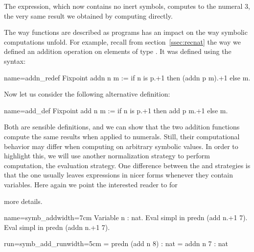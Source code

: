 The expression, which now contains no inert symbols, computes to the numeral 3,
the very same result we obtained by computing 
directly.


The way functions are described as programs has an impact on the way
symbolic computations unfold. For example, recall from
section~\ref{ssec:recnat} the way we defined an addition operation on
elements of type . It was defined using the  syntax: %

\begin{coq}{name=addn_redef}{}
Fixpoint addn n m := if n is p.+1 then (addn p m).+1 else m.
\end{coq}

Now let us consider the following alternative definition:

\begin{coq}{name=add_def}{}
Fixpoint add n m := if n is p.+1 then add p m.+1 else m.
\end{coq}

Both are sensible definitions, and we can show that the two addition
functions compute the same results when applied to numerals.  Still,
their computational behavior may differ when computing on arbitrary
symbolic values. In order to highlight this, we will use another
normalization strategy to perform computation, the 
evaluation strategy.  One difference between the 
and  strategies is that the  one usually leaves
expressions in nicer forms whenever they contain variables. Here again
we point the interested reader to \cite[section
5.3.7, ``Performing computations'']{Coq:manual} for

more details.

\begin{coq-left}{name=symb_add}{width=7cm}
Variable n : nat.
Eval simpl in predn (add  n.+1 7).
Eval simpl in predn (addn n.+1 7).
\end{coq-left}
\begin{coqout-right}{run=symb_add_run}{width=5cm}
= predn (add n 8) : nat
= addn n 7 : nat
\end{coqout-right}

